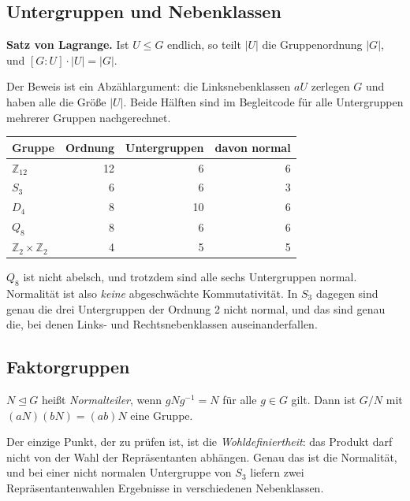 \documentclass[12pt, a4paper]{article}
\begin{document}
\subsection{Untergruppen und Nebenklassen}

\begin{definitionbox}
\textbf{Satz von Lagrange.} Ist $U \leq G$ endlich, so teilt $|U|$ die
Gruppenordnung $|G|$, und $[G:U] \cdot |U| = |G|$.
\end{definitionbox}

Der Beweis ist ein Abzählargument: die Linksnebenklassen $aU$ zerlegen $G$
und haben alle die Größe $|U|$. Beide Hälften sind im Begleitcode für alle
Untergruppen mehrerer Gruppen nachgerechnet.

\begin{center}
\begin{tabular}{lrrr}
\toprule
Gruppe & Ordnung & Untergruppen & davon normal\\
\midrule
$\mathbb{Z}_{12}$ & 12 & 6 & 6\\
$S_3$ & 6 & 6 & 3\\
$D_4$ & 8 & 10 & 6\\
$Q_8$ & 8 & 6 & 6\\
$\mathbb{Z}_2 \times \mathbb{Z}_2$ & 4 & 5 & 5\\
\bottomrule
\end{tabular}
\end{center}

\begin{notebox}
$Q_8$ ist nicht abelsch, und trotzdem sind alle sechs Untergruppen normal.
Normalität ist also \emph{keine} abgeschwächte Kommutativität. In $S_3$
dagegen sind genau die drei Untergruppen der Ordnung 2 nicht normal, und das
sind genau die, bei denen Links- und Rechtsnebenklassen auseinanderfallen.
\end{notebox}

\subsection{Faktorgruppen}

\begin{definitionbox}
$N \trianglelefteq G$ heißt \emph{Normalteiler}, wenn $gNg^{-1} = N$ für alle
$g \in G$ gilt. Dann ist $G/N$ mit $(aN)(bN) = (ab)N$ eine Gruppe.
\end{definitionbox}

Der einzige Punkt, der zu prüfen ist, ist die \emph{Wohldefiniertheit}: das
Produkt darf nicht von der Wahl der Repräsentanten abhängen. Genau das ist
die Normalität, und bei einer nicht normalen Untergruppe von $S_3$ liefern
zwei Repräsentantenwahlen Ergebnisse in verschiedenen Nebenklassen.
\end{document}
